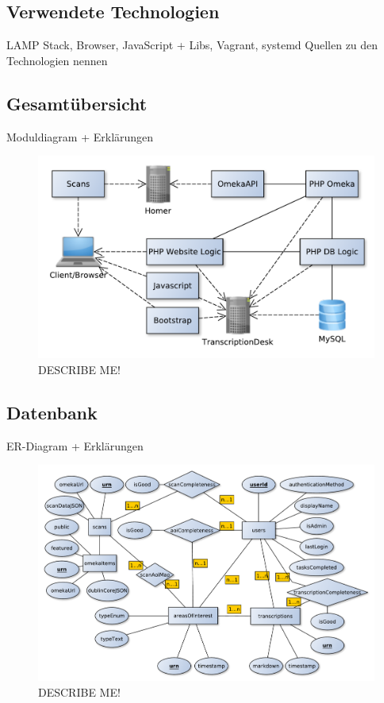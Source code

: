 \documentclass{article}
\begin{document}
\subsection{Verwendete Technologien}
LAMP Stack, Browser, JavaScript + Libs, Vagrant, systemd 
Quellen zu den Technologien nennen

\subsection{Gesamtübersicht}
Moduldiagram + Erklärungen
\\\begin{figure}
\includegraphics[width=\textwidth]{notes/components.pdf}
\caption{DESCRIBE ME!}
\label{fig:components}
\end{figure}

\subsection{Datenbank}
ER-Diagram + Erklärungen
\\\begin{figure}
\includegraphics[width=\textwidth]{notes/ER.pdf}
\caption{DESCRIBE ME!}
\label{fig:er}
\end{figure}
\end{document}
